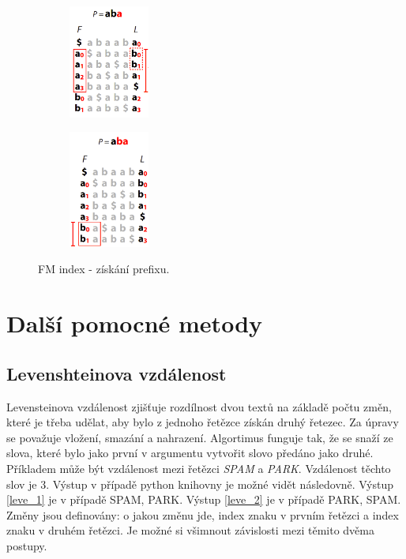 \documentclass[czech,DP]{thesiskiv}
\numberwithin{equation}{section}
\begin{document}
\begin{figure}[H]
		\centering
		\begin{subfigure}[t]{.4\textwidth}
			\centering
			\includegraphics[width=100px]{./img/FM_index_1.png}
		\end{subfigure}
		\begin{subfigure}[t]{.4\textwidth}
			\centering
			\includegraphics[width=100px]{./img/FM_index_2.png}
		\end{subfigure}	
		\caption{FM index - získání prefixu. \cite{bw_transform}}
		\label{fig:fm_index}
\end{figure}


\section{Další pomocné metody}
\subsection{Levenshteinova vzdálenost}
Levensteinova vzdálenost zjišťuje rozdílnost dvou textů na základě počtu změn, které je třeba udělat, aby bylo z jednoho řetězce získán druhý řetezec. Za úpravy se považuje vložení, smazání a nahrazení. Algortimus funguje tak, že se snaží ze slova, které bylo jako první v argumentu vytvořit slovo předáno jako druhé. Příkladem může být vzdálenost mezi řetězci \textit{SPAM} a \textit{PARK}.  Vzdálenost těchto slov je 3. Výstup v případě python knihovny je možné vidět následovně. Výstup \ref{leve_1} je v případě SPAM, PARK. Výstup \ref{leve_2} je v případě PARK, SPAM. Změny jsou definovány: o jakou změnu jde, index znaku v prvním řetězci a index znaku v druhém řetězci. Je možné si všimnout závislosti mezi těmito dvěma postupy. \cite{levenshrein_baku}
\end{document}
